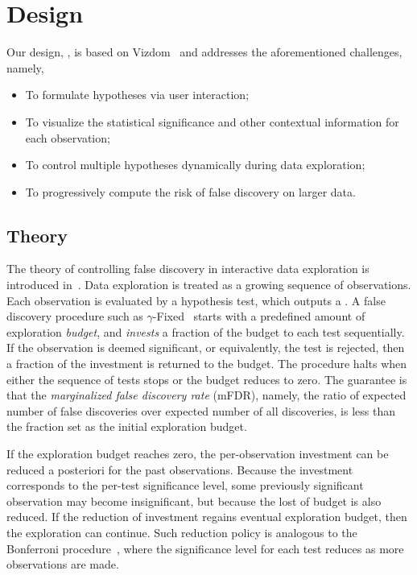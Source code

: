 \section{Design}
\label{sec:design}
Our design, \system{}, is based on Vizdom~\cite{vizdom} and addresses the aforementioned challenges, namely,
\begin{itemize}
    \item To formulate hypotheses via user interaction;
    \item To visualize the statistical significance and other contextual information for each observation;
    \item To control multiple hypotheses dynamically during data exploration;
    \item To progressively compute the risk of false discovery on larger data.
\end{itemize}

\subsection{Theory}
\label{sec:theory}
The theory of controlling false discovery in interactive data exploration is introduced in~\cite{zhao2016controlling}. Data exploration is treated as a growing sequence of observations.  Each observation is evaluated by a hypothesis test, which outputs a \pval{}. A false discovery procedure such as $\gamma$-Fixed~\cite{zhao2016controlling} starts with a predefined amount of exploration \textit{budget}, and \textit{invests} a fraction of the budget to each test sequentially.  If the observation is deemed significant, or equivalently, the test is rejected, then a fraction of the investment is returned to the budget. The procedure halts when either the sequence of tests stops or the budget reduces to zero.  The guarantee is that the \textit{marginalized false discovery rate} (mFDR), namely, the ratio of expected number of false discoveries over expected number of all discoveries, is less than the fraction set as the initial exploration budget.

If the exploration budget reaches zero, the per-observation investment can be reduced a posteriori for the past observations.  Because the investment corresponds to the per-test significance level, some previously significant observation may become insignificant, but because the lost of budget is also reduced.  If the reduction of investment regains eventual exploration budget, then the exploration can continue.  Such reduction policy is analogous to the Bonferroni procedure~\cite{bonferroni1936teoria}, where the significance level for each test reduces as more observations are made.

